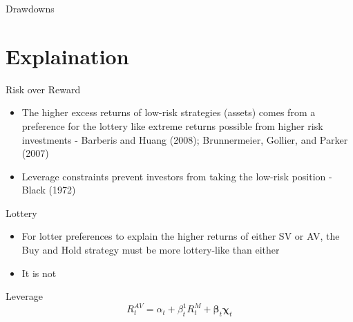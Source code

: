 \documentclass{beamer}
\begin{document}
\begin{frame}{Drawdowns}
	\begin{adjustbox}{width=\textwidth}
		
	\end{adjustbox}
	\begin{adjustbox}{width=\textwidth}
		
	\end{adjustbox}
\end{frame}

\section{Explaination}
\begin{frame}{Risk over Reward}
	\begin{itemize}
		\item The higher excess returns of low-risk strategies (assets) comes from a preference for the lottery like extreme returns possible from higher risk investments - Barberis and Huang (2008); Brunnermeier, Gollier, and Parker (2007)
		\item Leverage constraints prevent investors from taking the low-risk position - Black (1972)
	\end{itemize}
\end{frame}

\begin{frame}{Lottery}
	\begin{itemize}
		\item For lotter preferences to explain the higher returns of either SV or AV, the Buy and Hold strategy must be more lottery-like than either
		\item It is not
	\end{itemize}
		\begin{adjustbox}{width=\textwidth}
			
		\end{adjustbox}
\end{frame}

\begin{frame}{Leverage}
		\begin{equation}
		R^{AV}_{t} = \alpha_{t} + \beta^{1}_{t} R^{M}_{t} + \boldsymbol{\beta}_{t}\boldsymbol{\chi}_{t}
		\end{equation}
\end{frame}
\end{document}
